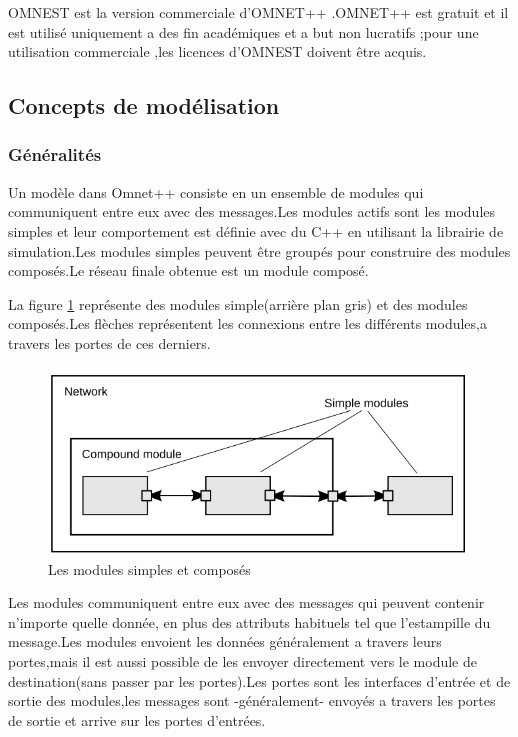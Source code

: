 OMNEST est la version commerciale d'OMNET++ .OMNET++ est gratuit et il est utilisé uniquement a des fin académiques et a but non lucratifs ;pour une utilisation commerciale ,les licences d'OMNEST doivent être acquis.

\subsection{Concepts de modélisation }
\subsubsection{Généralités}
Un modèle dans Omnet++ consiste en un ensemble de modules qui communiquent entre eux avec des messages.Les modules actifs sont les modules simples et leur comportement est définie avec du C++ en utilisant la librairie de simulation.Les modules simples peuvent être groupés pour construire des modules composés.Le réseau finale obtenue est  un module composé.

La figure \ref{simpleCompound} représente des modules simple(arrière plan gris) et des modules composés.Les flèches  représentent les connexions entre les différents modules,a travers les portes de ces derniers.

\begin{figure}[!h]
\includegraphics[scale=0.7]{simpleCompound}
\caption{\label{simpleCompound}Les modules simples et composés}
\end{figure}

					
Les modules communiquent entre eux  avec des messages qui peuvent contenir n'importe quelle donnée, en plus des attributs habituels tel que l'estampille du message.Les modules envoient les données généralement a travers leurs  portes,mais il est aussi possible de les envoyer directement vers le module de destination(sans passer par les portes).Les portes sont les interfaces d'entrée et de sortie des modules,les messages sont -généralement- envoyés a travers les portes de sortie et arrive sur les portes d'entrées.

